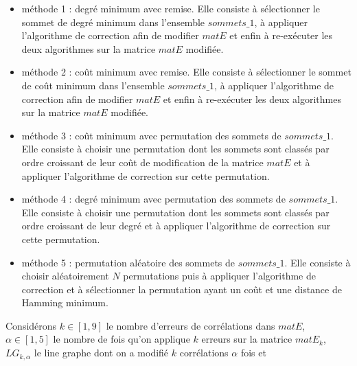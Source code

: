 \begin{itemize}
\item m\'ethode 1 : degr\'e minimum avec remise.\newline
Elle consiste \`a s\'electionner le sommet de degr\'e minimum dans l'ensemble $sommets\_1$, \`a appliquer l'algorithme de correction afin de modifier $matE$ et enfin \`a re-ex\'ecuter les deux algorithmes sur la matrice $matE$ modifi\'ee.
\item m\'ethode 2 : co\^ut minimum avec remise. \newline
Elle consiste \`a s\'electionner le sommet de co\^ut minimum dans l'ensemble $sommets\_1$, \`a appliquer l'algorithme de correction afin de modifier $matE$ et enfin \`a re-ex\'ecuter les deux algorithmes sur la matrice $matE$ modifi\'ee.
\item m\'ethode 3 : co\^ut minimum avec permutation des sommets de $sommets\_1$. \newline
Elle consiste \`a choisir une permutation dont les sommets sont class\'es par ordre croissant de leur co\^ut  de modification de la matrice $matE$ et \`a appliquer l'algorithme de correction sur cette permutation.
\item m\'ethode 4 :  degr\'e minimum avec  permutation des sommets de $sommets\_1$. \newline
Elle consiste \`a choisir une permutation dont les sommets sont class\'es par ordre croissant de leur degr\'e et \`a appliquer l'algorithme de correction sur cette permutation.
\item m\'ethode 5 : permutation al\'eatoire des sommets de $sommets\_1$. \newline
Elle consiste \`a choisir al\'eatoirement $N$ permutations puis \`a appliquer l'algorithme de correction et \`a s\'electionner la permutation ayant un co\^ut et une distance de Hamming minimum.
\end{itemize}
Consid\'erons 
 $k \in [1, 9]$ le nombre d'erreurs de corr\'elations dans $matE$,
  $\alpha \in [1, 5]$ le nombre de fois qu'on applique $k$ erreurs sur la matrice $matE_k$,  
 $LG_{k, \alpha}$ le line graphe dont on a modifi\'e $k$ corr\'elations $\alpha$ fois et 
